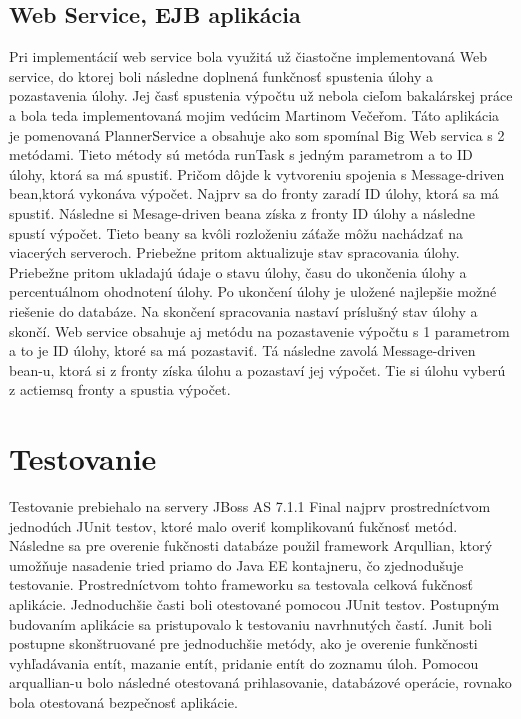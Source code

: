 \subsection{Web Service, EJB aplikácia}
Pri implementácií web service bola využitá už čiastočne implementovaná Web service, do ktorej boli následne doplnená funkčnosť spustenia úlohy a pozastavenia úlohy. Jej časť spustenia výpočtu už nebola cieľom bakalárskej práce a bola teda implementovaná mojim vedúcim Martinom Večeřom.
Táto aplikácia je pomenovaná PlannerService a obsahuje ako som spomínal Big Web servica s 2 metódami. Tieto métody sú metóda runTask s jedným parametrom a to ID úlohy, ktorá sa má spustiť. Pričom dôjde k vytvoreniu spojenia s Message-driven bean,ktorá vykonáva výpočet. Najprv sa do fronty zaradí ID úlohy, ktorá sa má spustiť. Následne si Mesage-driven beana získa z fronty ID úlohy a následne spustí výpočet. Tieto beany sa kvôli rozloženiu záťaže môžu nachádzať na viacerých serveroch. Priebežne pritom aktualizuje stav spracovania úlohy. Priebežne pritom ukladajú údaje o stavu úlohy, času do ukončenia úlohy a percentuálnom ohodnotení úlohy. Po ukončení úlohy je uložené najlepšie možné riešenie do databáze. Na skončení spracovania nastaví príslušný stav úlohy a skončí. Web service obsahuje aj metódu na pozastavenie výpočtu s 1 parametrom a to je ID úlohy, ktoré sa má pozastaviť. Tá následne zavolá Message-driven bean-u, ktorá si z fronty získa úlohu a pozastaví jej výpočet. Tie si úlohu vyberú z actiemsq fronty a spustia výpočet. 
	
	



 
\section{Testovanie}
Testovanie prebiehalo na servery JBoss AS 7.1.1 Final najprv prostredníctvom jednodúch JUnit testov, ktoré malo overiť komplikovanú fukčnosť metód. Následne sa pre overenie fukčnosti databáze použil framework Arqullian, ktorý umožňuje nasadenie tried priamo do Java EE kontajneru, čo zjednodušuje testovanie. Prostredníctvom tohto frameworku sa testovala celková fukčnosť aplikácie. Jednoduchšie časti boli otestované pomocou JUnit testov. Postupným budovaním aplikácie sa pristupovalo k testovaniu navrhnutých častí. Junit boli postupne skonštruované pre jednoduchšie metódy, ako je overenie funkčnosti vyhľadávania entít, mazanie entít, pridanie entít do zoznamu úloh. Pomocou arquallian-u bolo následné otestovaná prihlasovanie, databázové operácie, rovnako bola otestovaná bezpečnosť aplikácie.


